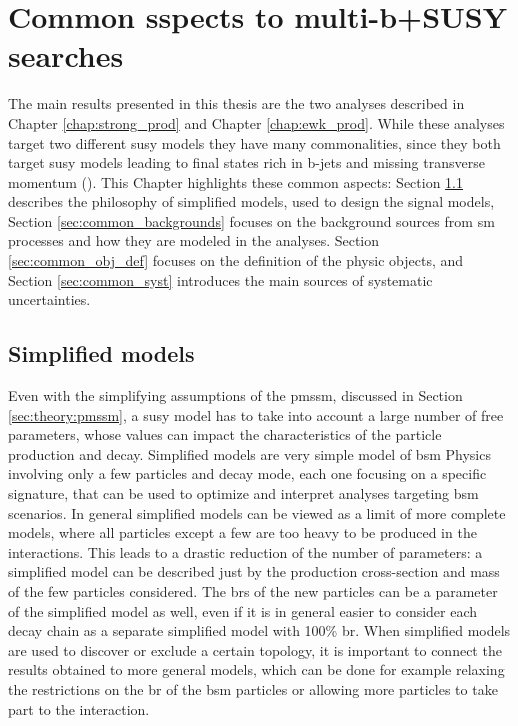 \chapter{Common sspects to multi-b+\met SUSY searches}
\label{chap:multib_general}

The main results presented in this thesis are the two analyses described in Chapter \ref{chap:strong_prod} and Chapter \ref{chap:ewk_prod}. While these analyses target two different \gls{susy} models they have many commonalities, since they both target \gls{susy} models leading to final states rich in b-jets and missing transverse momentum (\met). This Chapter highlights these common aspects: Section \ref{sec:simplified_models} describes the philosophy of simplified models, used to design the signal models, Section \ref{sec:common_backgrounds} focuses on the background sources from \gls{sm} processes and how they are modeled in the analyses. 
Section \ref{sec:common_obj_def} focuses on the definition of the physic objects, and Section \ref{sec:common_syst} introduces the main sources of 
systematic uncertainties.

\section{Simplified models}
\label{sec:simplified_models}

Even with the simplifying assumptions of the \gls{pmssm}, discussed in Section \ref{sec:theory:pmssm}, a \gls{susy} model has to take into account a large number of free parameters, whose values can impact the characteristics of the particle production and decay. 
Simplified models \cite{Alves:2011wf} are very simple model of \gls{bsm} Physics involving only a few particles and decay mode, 
each one focusing on a specific signature, that can be used to optimize and interpret analyses targeting \gls{bsm} scenarios. 
In general simplified models can be viewed as a limit of more complete models, where all particles except a few are too heavy to be 
produced in the interactions. This leads to a drastic reduction of the number of parameters: a simplified model can be described just by the production cross-section and mass of the few particles considered. 
The \glspl{br} of the new particles can be a parameter of the simplified model as well, even if it is in general easier to consider each decay chain as a separate simplified model with 100\% \gls{br}.
When simplified models are used to discover or exclude a certain topology, it is important to connect the results obtained to more general models, 
which can be done for example relaxing the restrictions on the \gls{br} of the \gls{bsm} particles or allowing more particles to take part to the interaction.

